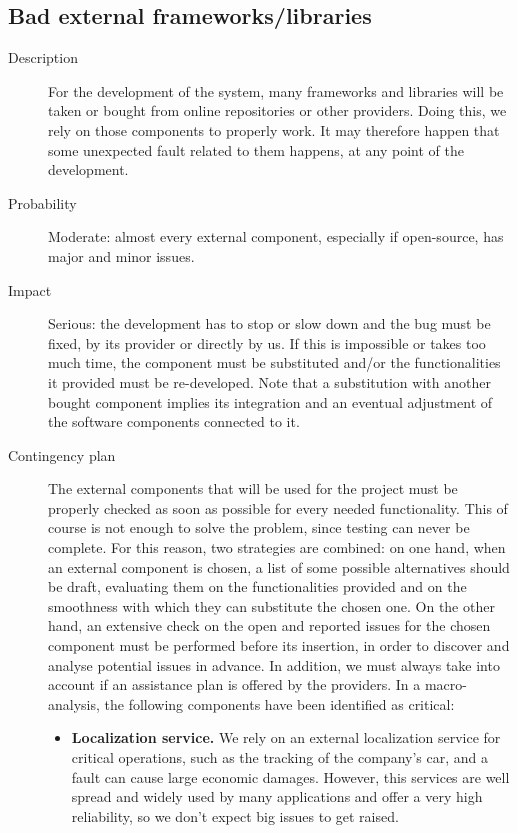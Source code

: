 \subsection*{Bad external frameworks/libraries}
	\begin{description}
		\item[Description] For the development of the system, many frameworks and libraries will be taken or bought from online repositories or other providers. Doing this, we rely on those components to properly work. It may therefore happen that some unexpected fault related to them happens, at any point of the development.
		\item[Probability] Moderate: almost every external component, especially if open-source, has major and minor issues.
		\item[Impact] Serious: the development has to stop or slow down and the bug must be fixed, by its provider or directly by us. If this is impossible or takes too much time, the component must be substituted and/or the functionalities it provided must be re-developed. Note that a substitution with another bought component implies its integration and an eventual adjustment of the software components connected to it.
		\item[Contingency plan] The external components that will be used for the project must be properly checked as soon as possible for every needed functionality. This of course is not enough to solve the problem, since testing can never be complete. For this reason, two strategies are combined: on one hand, when an external component is chosen, a list of some possible alternatives should be draft, evaluating them on the functionalities provided and on the smoothness with which they can substitute the chosen one. On the other hand, an extensive check on the open and reported issues for the chosen component must be performed before its insertion, in order to discover and analyse potential issues in advance. In addition, we must always take into account if an assistance plan is offered by the providers.\newline
		In a macro-analysis, the following components have been identified as critical:
			\begin{itemize}
				\item \textbf{Localization service.} We rely on an external localization service for critical operations, such as the tracking of the company's car, and a fault can cause large economic damages. However, this services are well spread and widely used by many applications and offer a very high reliability, so we don't expect big issues to get raised.

\end{itemize}
\end{description}
